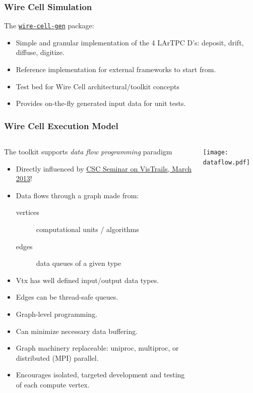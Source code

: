 \documentclass[xcolor=dvipsnames]{beamer}
\begin{document}
\begin{frame}
  \frametitle{Wire Cell Simulation}

  The \href{https://github.com/WireCell/wire-cell-gen}{\texttt{wire-cell-gen}} package:
  \begin{itemize}
  \item Simple and granular implementation of the 4 LArTPC D's:
    deposit, drift, diffuse, digitize.
  \item Reference implementation for external frameworks to start from.
  \item Test bed for Wire Cell 
    architectural/toolkit concepts
  \item Provides on-the-fly generated input data for unit tests.
  \end{itemize}


\end{frame}

\begin{frame}[fragile]
  \frametitle{Wire Cell Execution Model}

  \begin{columns}
    \begin{column}{0.7\textwidth}
      \footnotesize 
      The toolkit supports \textit{data flow programming} paradigm
      \begin{itemize}
        \item Directly influenced by \href{http://www0.bnl.gov/events/details.php?q=8932}{CSC Seminar on VisTrails, March 2013}!
        \item Data flows through a graph made from:
          \begin{description}
          \item[vertices] computational units / algorithms
          \item[edges] data queues of a given type
          \end{description}
        \item Vtx has well defined input/output data types.
        \item Edges can be thread-safe queues.
        \item Graph-level programming.
        \item Can minimize necessary data buffering.
        \item Graph machinery replaceable: uniproc, multiproc, or
          distributed (MPI) parallel.
        \item Encourages isolated, targeted development and testing of each
          compute vertex.
        \end{itemize}
      \end{column}
      \begin{column}{0.3\textwidth}

        \vspace{-10mm}

        \texttt{[image: dataflow.pdf]}
      \end{column}
    \end{columns}
\end{frame}
\end{document}
